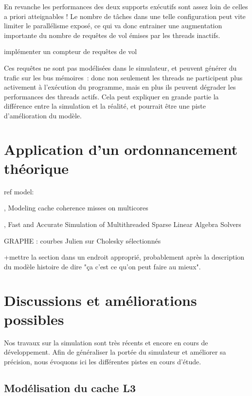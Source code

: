 En revanche les performances des deux supports exécutifs sont assez loin de celles a priori atteignables !
Le nombre de tâches dans une telle configuration peut vite limiter le parallélisme exposé, ce qui va donc entrainer une augmentation importante du nombre de requêtes de vol émises par les threads inactifs.
\begin{todo}
  implémenter un compteur de requêtes de vol
\end{todo}

Ces requêtes ne sont pas modélisées dans le simulateur, et peuvent générer du trafic sur les bus mémoires~: donc non seulement les threads ne participent plus activement à l'exécution du programme, mais en plus ils peuvent dégrader les performances des threads actifs.
Cela peut expliquer en grande partie la différence entre la simulation et la réalité, et pourrait être une piste d'amélioration du modèle.


\section{Application d'un ordonnancement théorique}\label{sec:simulation:theorie}

ref model:

\cite{Pan2014}, Modeling cache coherence misses on multicores

\cite{Stanisic2016}, Fast and Accurate Simulation of Multithreaded Sparse Linear Algebra Solvers

\begin{todo}
GRAPHE : courbes Julien sur Cholesky sélectionnés

+mettre la section dans un endroit approprié, probablement après la description du modèle histoire de dire "ça c'est ce qu'on peut faire au mieux".
\end{todo}

\section{Discussions et améliorations possibles}\label{sec:simulation:next}

Nos travaux sur la simulation sont très récents et encore en cours de développement.
Afin de généraliser la portée du simulateur et améliorer sa précision, nous évoquons ici les différentes pistes en cours d'étude.

\subsection{Modélisation du cache L3}

